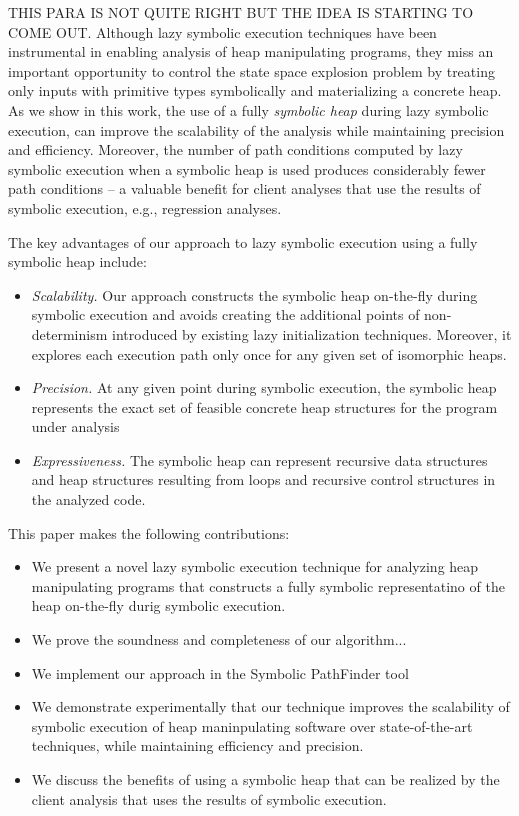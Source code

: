 THIS PARA IS NOT QUITE RIGHT BUT THE IDEA IS STARTING TO COME OUT.
Although lazy symbolic execution techniques have been instrumental 
in enabling analysis of heap manipulating programs, they miss an
important opportunity to control the state space explosion problem
by treating only inputs with primitive types symbolically and
materializing a concrete heap. As we show in this work, the use of
a fully \emph{symbolic heap} during lazy symbolic execution, 
can improve the scalability of the analysis while maintaining
precision and efficiency. Moreover, the number of path conditions
computed by lazy symbolic execution when a symbolic heap
is used
produces considerably fewer path conditions -- a valuable benefit
for client analyses that use the results of symbolic execution,
e.g., regression analyses.

The key advantages of our approach to lazy symbolic execution
using a fully symbolic heap include:
\begin{itemize}
\item{\emph{Scalability.} Our approach constructs the symbolic
heap on-the-fly during symbolic execution and avoids creating
the additional points of non-determinism
introduced by existing lazy initialization techniques. Moreover, it explores
each execution path only once for any given set of isomorphic heaps.}
\item{\emph{Precision.} At any given point during symbolic execution, 
the symbolic heap represents the exact set of feasible
concrete heap structures for the program under analysis}
\item{\emph{Expressiveness.} The symbolic heap can represent recursive 
data structures  and heap structures resulting from loops and recursive control 
structures in the analyzed code. }
 \end{itemize}

This paper makes the following contributions:

\begin{itemize}
\item{We present a novel lazy symbolic execution technique
 for analyzing heap manipulating
programs that constructs a fully symbolic representatino of
the heap on-the-fly durig symbolic execution.}
\item{We prove the soundness and completeness of our algorithm...}
\item{We implement our approach in the Symbolic PathFinder tool}
\item{We demonstrate experimentally that our technique improves
the scalability of symbolic execution of heap maninpulating software
over state-of-the-art techniques, while maintaining efficiency and precision.}
  \item{We discuss the benefits of using a symbolic heap that
  can be realized by the client analysis that uses the results of symbolic execution.}
 \end{itemize}

